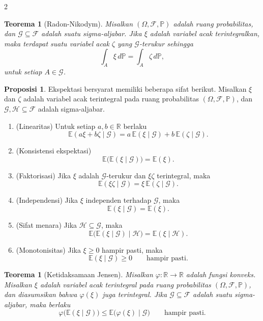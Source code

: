 \documentclass[a4paper,extrafontsizes, 9pt]{memoir}
\theoremstyle{definition}
\newtheorem{proposisi}[kalstok]{Proposisi}
\theoremstyle{plain}
\newtheorem{teorema}[kalstok]{Teorema}
\theoremstyle{remark}
\begin{document}
\begin{multicols}{2}
  \begin{teorema}[Radon-Nikodym]
    Misalkan $(\Omega,\mathcal{F},\mathbb{P})$ adalah ruang probabilitas, dan
    $\mathcal{G}\subseteq\mathcal{F}$ adalah suatu sigma-aljabar. Jika $\xi$ adalah variabel
    acak terintegralkan, maka terdapat suatu variabel acak $\zeta$ yang $\mathcal{G}$-terukur
    sehingga
    \[\int_A \xi\,d\mathbb{P}=\int_A \zeta\,d\mathbb{P},\]
    untuk setiap $A\in\mathcal{G}$.
  \end{teorema}

  \begin{proposisi}
    Ekspektasi bersyarat memiliki beberapa sifat berikut. Misalkan $\xi$ dan $\zeta$ adalah
    variabel acak terintegral pada ruang probabilitas $(\Omega,\mathcal{F},\mathbb{P})$, dan
    $\mathcal{G},\mathcal{H}\subseteq\mathcal{F}$ adalah sigma-aljabar.
    \begin{enumerate}[leftmargin=*, itemsep=0.5mm]
      \item (Linearitas) Untuk setiap $a,b\in\mathbb{R}$ berlaku
            \[\mathbb{E}(a\xi+b\zeta\mid\mathcal{G})
              =a\,\mathbb{E}(\xi\mid\mathcal{G})+b\,\mathbb{E}(\zeta\mid\mathcal{G}).\]
      \item (Konsistensi ekspektasi)
            \[\mathbb{E}\bigl(\mathbb{E}(\xi\mid\mathcal{G})\bigr)=\mathbb{E}(\xi).\]
      \item (Faktorisasi) Jika $\xi$ adalah $\mathcal{G}$-terukur dan $\xi\zeta$ terintegral, maka
            \[\mathbb{E}(\xi\zeta\mid\mathcal{G})=\xi\,\mathbb{E}(\zeta\mid\mathcal{G}).\]
      \item (Independensi) Jika $\xi$ independen terhadap $\mathcal{G}$, maka
            \[\mathbb{E}(\xi\mid\mathcal{G})=\mathbb{E}(\xi).\]
      \item (Sifat menara) Jika $\mathcal{H}\subseteq\mathcal{G}$, maka
            \[\mathbb{E}\bigl(\mathbb{E}(\xi\mid\mathcal{G})\mid\mathcal{H}\bigr)
              =\mathbb{E}(\xi\mid\mathcal{H}).\]
      \item (Monotonisitas) Jika $\xi\ge 0$ hampir pasti, maka
            \[\mathbb{E}(\xi\mid\mathcal{G})\ge 0\qquad \text{hampir pasti}.\]
    \end{enumerate}
  \end{proposisi}

  \begin{teorema}[Ketidaksamaan Jensen]
    Misalkan $\varphi:\mathbb{R}\to\mathbb{R}$ adalah fungsi konveks. Misalkan $\xi$ adalah
    variabel acak terintegral pada ruang probabilitas $(\Omega,\mathcal{F},\mathbb{P})$, dan
    diasumsikan bahwa $\varphi(\xi)$ juga terintegral. Jika $\mathcal{G}\subseteq\mathcal{F}$
    adalah suatu sigma-aljabar, maka berlaku
    \[\varphi\bigl(\mathbb{E}(\xi\mid\mathcal{G})\bigr)\le
      \mathbb{E}\bigl(\varphi(\xi)\mid\mathcal{G}\bigr)\qquad \text{hampir pasti}.\]
  \end{teorema}


\end{multicols}
\end{document}

